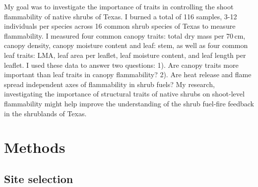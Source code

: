 \documentclass{ttuthes2007}
\begin{document}
My goal was to investigate the importance of traits in controlling the shoot flammability of native shrubs of Texas. %
I burned a total of 116 samples, 3-12 individuals per species across 16 common shrub species of Texas to measure flammability. I measured four common canopy traits: total dry mass per 70\,cm, canopy density, canopy moisture content and leaf: stem, as well as four common leaf traits: LMA, leaf area per leaflet, leaf moisture content, and leaf length per leaflet. I used these data to answer two questions: 1). Are canopy traits more important than leaf traits in canopy flammability? 2). Are heat release and flame spread independent axes of flammability in shrub fuels? My research, investigating the importance of structural traits of native shrubs on shoot-level flammability might help improve the understanding of the shrub fuel-fire feedback in the shrublands of Texas.


\section{Methods}
\subsection{Site selection}\
\end{document}

